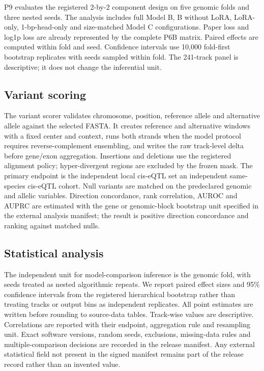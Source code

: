 \documentclass[pdflatex,sn-nature]{sn-jnl}
\newcommand{\ExtVariantDataset}{an independent same-species cis-eQTL cohort}
\newcommand{\ExtVariant}{positive direction concordance and ranking against matched nulls}
\begin{document}
P9 evaluates the registered 2-by-2 component design on five genomic folds and
three nested seeds. The analysis includes full Model B, B without LoRA,
LoRA-only, 1-bp-head-only and size-matched Model C configurations. Paper loss
and log1p loss are already represented by the complete P6B matrix. Paired
effects are computed within fold and seed. Confidence intervals use 10,000
fold-first bootstrap replicates with seeds sampled within fold. The 241-track
panel is descriptive; it does not change the inferential unit.

\subsection{Variant scoring}

The variant scorer validates chromosome, position, reference allele and
alternative allele against the selected FASTA. It creates reference and
alternative windows with a fixed center and context, runs both strands when
the model protocol requires reverse-complement ensembling, and writes the raw
track-level delta before gene/exon aggregation. Insertions and deletions use
the registered alignment policy; hyper-divergent regions are excluded by the
frozen mask. The primary endpoint is the independent local cis-eQTL set
\ExtVariantDataset. Null variants are matched on the predeclared genomic and
allelic variables. Direction concordance, rank correlation, AUROC and AUPRC
are estimated with the gene or genomic-block bootstrap unit specified in the
external analysis manifest; the result is \ExtVariant.

\subsection{Statistical analysis}

The independent unit for model-comparison inference is the genomic fold, with
seeds treated as nested algorithmic repeats. We report paired effect sizes and
95\% confidence intervals from the registered hierarchical bootstrap rather
than treating tracks or output bins as independent replicates. All point
estimates are written before rounding to source-data tables. Track-wise values
are descriptive. Correlations are reported with their endpoint, aggregation
rule and resampling unit. Exact software versions, random seeds, exclusions,
missing-data rules and multiple-comparison decisions are recorded in the
release manifest. Any external statistical field not present in the signed
manifest remains part of the release record rather than an invented value.
\end{document}
